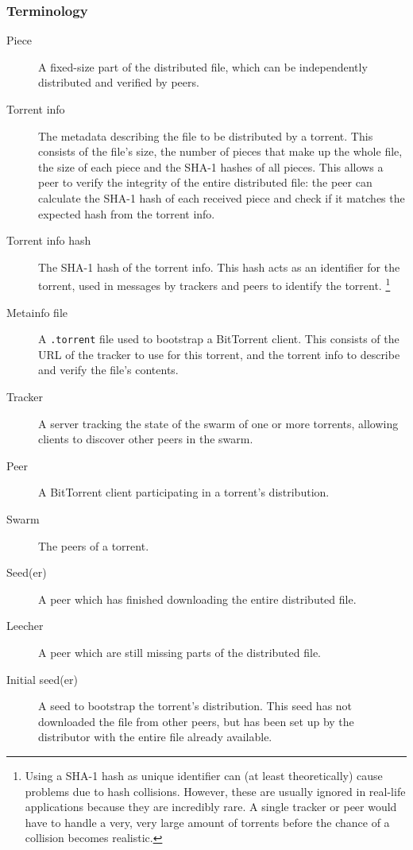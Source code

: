 \subsubsection{Terminology}
\begin{description}
\item[Piece] A fixed-size part of the distributed file, which can be independently distributed and verified by peers.
\item[Torrent info] The metadata describing the file to be distributed by a torrent. This consists of the file's size, the number of pieces that make up the whole file, the size of each piece and the SHA-1 hashes of all pieces. This allows a peer to verify the integrity of the entire distributed file: the peer can calculate the SHA-1 hash of each received piece and check if it matches the expected hash from the torrent info.
\item[Torrent info hash] The SHA-1 hash of the torrent info. This hash acts as an identifier for the torrent, used in messages by trackers and peers to identify the torrent. \footnote{Using a SHA-1 hash as unique identifier can (at least theoretically) cause problems due to hash collisions. However, these are usually ignored in real-life applications because they are incredibly rare. A single tracker or peer would have to handle a very, very large amount of torrents before the chance of a collision becomes realistic.}
\item[Metainfo file] A \texttt{.torrent} file used to bootstrap a BitTorrent client. This consists of the URL of the tracker to use for this torrent, and the torrent info to describe and verify the file's contents.
\item[Tracker] A server tracking the state of the swarm of one or more torrents, allowing clients to discover other peers in the swarm.
\item[Peer] A BitTorrent client participating in a torrent's distribution.
\item[Swarm] The peers of a torrent.
\item[Seed(er)] A peer which has finished downloading the entire distributed file.
\item[Leecher] A peer which are still missing parts of the distributed file.
\item[Initial seed(er)] A seed to bootstrap the torrent's distribution. This seed has not downloaded the file from other peers, but has been set up by the distributor with the entire file already available.
\end{description}

